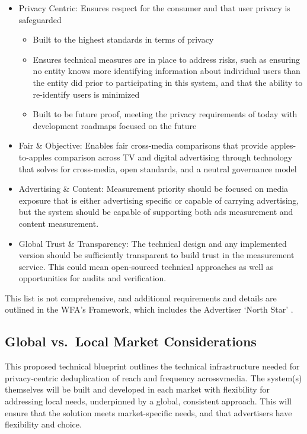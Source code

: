 \documentclass[]{article}
\providecommand{\tightlist}{%
  \setlength{\itemsep}{0pt}\setlength{\parskip}{0pt}}
\begin{document}
\begin{itemize}
\tightlist
\item
  Privacy Centric: Ensures respect for the consumer and that user
  privacy is safeguarded

  \begin{itemize}
  \tightlist
  \item
    Built to the highest standards in terms of privacy
  \item
    Ensures technical measures are in place to address risks, such as
    ensuring no entity knows more identifying information about
    individual users than the entity did prior to participating in this
    system, and that the ability to re-identify users is minimized
  \item
    Built to be future proof, meeting the privacy requirements of today
    with development roadmaps focused on the future
  \end{itemize}
\item
  Fair \& Objective: Enables fair cross-media comparisons that provide
  apples-to-apples comparison across TV and digital advertising through
  technology that solves for cross-media, open standards, and a neutral
  governance model
\item
  Advertising \& Content: Measurement priority should be focused on
  media exposure that is either advertising specific or capable of
  carrying advertising, but the system should be capable of supporting
  both ads measurement and content measurement.
\item
  Global Trust \& Transparency: The technical design and any implemented
  version should be sufficiently transparent to build trust in the
  measurement service. This could mean open-sourced technical approaches
  as well as opportunities for audits and verification.
\end{itemize}

This list is not comprehensive, and additional requirements and details
are outlined in the WFA's Framework, which includes the Advertiser
`North Star' .


\subsection{Global vs.~Local Market Considerations}

This proposed technical blueprint outlines the technical infrastructure needed for privacy-centric deduplication of reach and frequency acrossvmedia. The system(s) themselves will be built and developed in each
market with flexibility for addressing local needs, underpinned by a global, consistent approach. This will ensure that the solution meets market-specific needs, and that advertisers have flexibility and choice.
\end{document}
